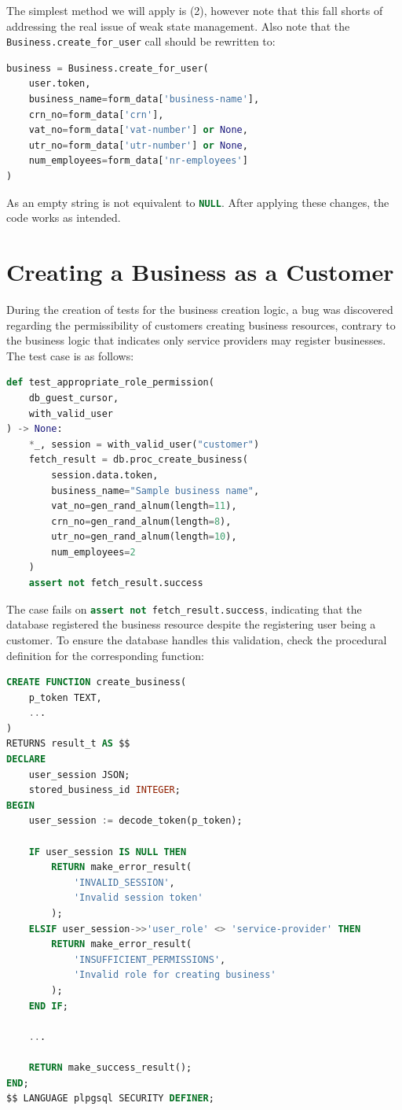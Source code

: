 \documentclass[journal]{IEEEtran}
\begin{document}
	The simplest method we will apply is (2), however note that this fall shorts of addressing the real issue of weak state management. Also note that the \lstinline[language=Python]|Business.create_for_user| call should be rewritten to:
	
	\begin{lstlisting}[language=Python]
business = Business.create_for_user(
	user.token,
	business_name=form_data['business-name'],
	crn_no=form_data['crn'],
	vat_no=form_data['vat-number'] or None,
	utr_no=form_data['utr-number'] or None,
	num_employees=form_data['nr-employees']
)
	\end{lstlisting}

	As an empty string is not equivalent to \lstinline[language=SQL]|NULL|. After applying these changes, the code works as intended.
	
	\section{Creating a Business as a Customer}
	
	During the creation of tests for the business creation logic, a bug was discovered regarding the permissibility of customers creating business resources, contrary to the business logic that indicates only service providers may register businesses. The test case is as follows:
	
	\begin{lstlisting}[language=Python]
def test_appropriate_role_permission(
	db_guest_cursor,
	with_valid_user
) -> None:
	*_, session = with_valid_user("customer")
	fetch_result = db.proc_create_business(
		session.data.token,
		business_name="Sample business name",
		vat_no=gen_rand_alnum(length=11),
		crn_no=gen_rand_alnum(length=8),
		utr_no=gen_rand_alnum(length=10),
		num_employees=2
	)
	assert not fetch_result.success
	\end{lstlisting}
	
	The case fails on \lstinline[language=Python]|assert not fetch_result.success|, indicating that the database registered the business resource despite the registering user being a customer. To ensure the database handles this validation, check the procedural definition for the corresponding function:
	
	\begin{lstlisting}[language=SQL]
CREATE FUNCTION create_business(
	p_token TEXT,
	...
)
RETURNS result_t AS $$
DECLARE
	user_session JSON;
	stored_business_id INTEGER;
BEGIN
	user_session := decode_token(p_token);
	
	IF user_session IS NULL THEN
		RETURN make_error_result(
			'INVALID_SESSION',
			'Invalid session token'
		);
	ELSIF user_session->>'user_role' <> 'service-provider' THEN
		RETURN make_error_result(
			'INSUFFICIENT_PERMISSIONS',
			'Invalid role for creating business'
		);
	END IF;
	
	...
	
	RETURN make_success_result();
END;
$$ LANGUAGE plpgsql SECURITY DEFINER;
	\end{lstlisting}
	
\end{document}
